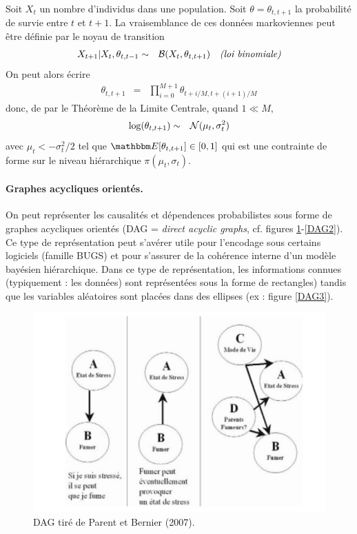 \begin{exo}
Soit $X_t$ un nombre d'individus dans une population. Soit $\theta=\theta_{t,t+1}$ la probabilité de survie entre $t$ et $t+1$. La vraisemblance de ces données markoviennes peut être définie par le noyau de transition 
\begin{eqnarray*}
X_{t+1}|X_t,\theta_{t,t-1} & \sim & {\cal{B}}(X_t,\theta_{t,t+1}) \ \ \ \text{\it (loi binomiale)}
\end{eqnarray*}
 On peut alors écrire
\begin{eqnarray*}
\theta_{t,t+1} & = & \prod_{i=0}^{M+1} \theta_{t+i/M,t+(i+1)/M}
\end{eqnarray*}
donc, de par le Théorème de la Limite Centrale, quand $1\ll M$,
\begin{eqnarray*}
\log(\theta_{t,t+1}) & \sim & {\cal{N}}(\mu_t,\sigma^2_t)
\end{eqnarray*}
avec $\mu_t<-\sigma^2_t/2$ tel que $\E[\theta_{t,t+1}] \in[0,1]$ qui est une contrainte de  forme sur le niveau hiérarchique $\pi(\mu_t,\sigma_t)$.
\end{exo}

\paragraph{Graphes acycliques orientés.} On peut représenter les causalités et dépendences probabilistes sous forme de graphes acycliques orientés (DAG = {\it direct acyclic graphs}, cf. figures \ref{DAG1}-\ref{DAG2}). Ce type de représentation peut s'avérer utile pour l'encodage sous certains logiciels (famille BUGS) et pour s'assurer de la cohérence interne d'un modèle bayésien hiérarchique. Dans ce type de représentation, les informations connues (typiquement : les données) sont représentées sous la forme de rectangles) tandis que les variables aléatoires sont placées dans des ellipses (ex : figure \ref{DAG3}).

\begin{figure}[h!]
\centering
\includegraphics[scale=0.4]{figures/prior/parent1.jpeg}
\caption{DAG tiré de Parent et Bernier (2007). }
\label{DAG1}
\end{figure}

